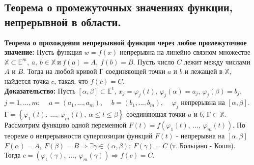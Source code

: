 \documentclass[a4paper,14pt]{extreport}
\begin{document}
\subsection*{Теорема о промежуточных значениях функции, непрерывной в области.}
\textbf{Теорема о прохождении непрерывной функции через любое промежуточное значение:} Пусть функция $w = f(x)$ непрерывна на линейно связном множестве $\mathbb{X} \subset \mathbb{E}^m, ~ a, ~ b \in \mathbb{X} ~ и ~ f(a) = A, ~ f(b) = B$. Пусть число $C$ лежит между числами $A$ и $B$. Тогда на любой кривой $Г$ соединяющей точки $a$ и $b$ и лежащей в $\mathbb{X}$, найдется точка $c$, такая, что $f(c) = C$.
\\[2mm]\textbf{Доказательство:} Пусть $[\alpha, \beta] \subset \mathbb{E}^1$, $x_j = \varphi_j(t)$, $\varphi_j(\alpha) = a_j$, $\varphi_j(\beta) = b_j$, $j = 1, ..., m$;
$\quad a = (a_1, ..., a_m)$, $\quad b = (b_1, ..., b_m)$, $\quad \varphi_j$ непрерывна на $[\alpha, \beta]$.
$Г = \left\{\varphi_1(t),~ ..., ~\varphi_m(t), ~\alpha \leq t \leq \beta \right\}$ соединяющая точки $a$ и $b$, $Г \subset \mathbb{X}$.
Рассмотрим функцию одной переменной $F(t) = f(\varphi_1(t),~ ..., ~\varphi_m(t))$. По теореме о непрерывности суперпозиции функций $F(t)$ - непрерывна на $[\alpha, \beta]$
$F(\alpha) = A, ~ F(\beta) = B \Rightarrow \exists \gamma \in (\alpha, \beta): ~ F(\gamma) = C$ (т. Больцано - Коши). 
Тогда $c = (\varphi_1(\gamma),~ ..., ~\varphi_m(\gamma)) \Rightarrow f(c) = C.$
\end{document}
